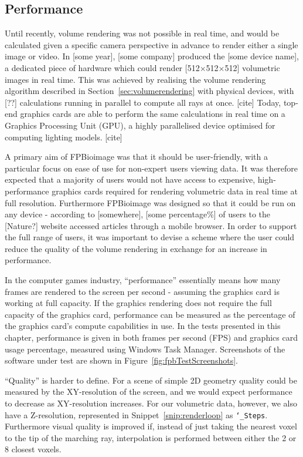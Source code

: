 \subsection{Performance} \label{sec:fpbPerformance}
Until recently, volume rendering was not possible in real time, and would be calculated given a specific camera perspective in advance to render either a single image or video.
In [some year], [some company] produced the [some device name], a dedicated piece of hardware which could render [512$\times$512$\times$512] volumetric images in real time.
This was achieved by realising the volume rendering algorithm described in Section~\ref{sec:volumerendering} with physical devices, with [??] calculations running in parallel to compute all rays at once. [cite]
Today, top-end graphics cards are able to perform the same calculations in real time on a Graphics Processing Unit (GPU), a highly parallelised device optimised for computing lighting models. [cite]

A primary aim of FPBioimage was that it should be user-friendly, with a particular focus on ease of use for non-expert users viewing data.
It was therefore expected that a majority of users would not have access to expensive, high-performance graphics cards required for rendering volumetric data in real time at full resolution.
Furthermore FPBioimage was designed so that it could be run on any device - according to [somewhere], [some percentage\%] of users to the [Nature?] website accessed articles through a mobile browser.
In order to support the full range of users, it was important to devise a scheme where the user could reduce the quality of the volume rendering in exchange for an increase in performance.

In the computer games industry, ``performance'' essentially means how many frames are rendered to the screen per second - assuming the graphics card is working at full capacity.
If the graphics rendering does not require the full capacity of the graphics card, performance can be measured as the percentage of the graphics card's compute capabilities in use.
In the tests presented in this chapter, performance is given in both frames per second (FPS) and graphics card usage percentage, measured using Windows Task Manager.
Screenshots of the software under test are shown in Figure~\ref{fig:fpbTestScreenshots}.

``Quality'' is harder to define.
For a scene of simple 2D geometry quality could be measured by the XY-resolution of the screen, and we would expect performance to decrease as XY-resolution increases.
For our volumetric data, however, we also have a Z-resolution, represented in Snippet~\ref{snip:renderloop} as \texttt{\char`_Steps}.
Furthermore visual quality is improved if, instead of just taking the nearest voxel to the tip of the marching ray, interpolation is performed between either the 2 or 8 closest voxels.

